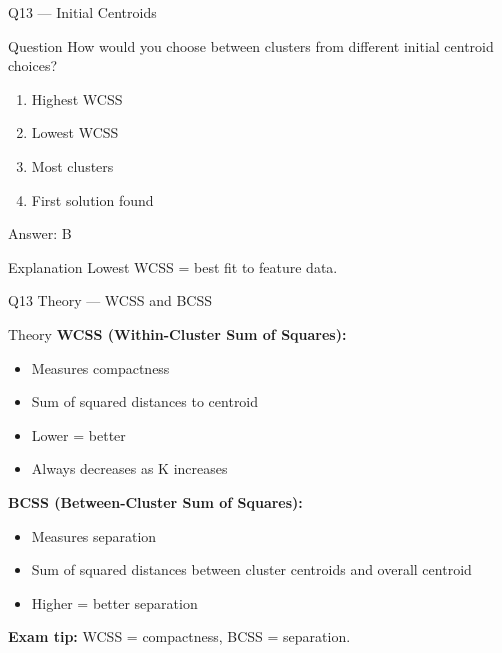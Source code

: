 \documentclass[aspectratio=169,8pt]{beamer}
\begin{document}
	
	\begin{frame}{Q13 --- Initial Centroids}
		\begin{block}{Question}
			How would you choose between clusters from different initial centroid choices?
		\end{block}
		\begin{enumerate}[label=\Alph*.]
			\item Highest WCSS
			\item Lowest WCSS
			\item Most clusters
			\item First solution found
		\end{enumerate}
		\begin{exampleblock}{Answer: B}
		\end{exampleblock}
		\begin{block}{Explanation}
			Lowest WCSS = best fit to feature data.
		\end{block}
	\end{frame}
	
	\begin{frame}{Q13 Theory --- WCSS and BCSS}
		\begin{block}{Theory}
			\textbf{WCSS (Within-Cluster Sum of Squares):}
			\begin{itemize}
				\item Measures compactness
				\item Sum of squared distances to centroid
				\item Lower = better
				\item Always decreases as K increases
			\end{itemize}
			\textbf{BCSS (Between-Cluster Sum of Squares):}
			\begin{itemize}
				\item Measures separation
				\item Sum of squared distances between cluster centroids and overall centroid
				\item Higher = better separation
			\end{itemize}
			\textbf{Exam tip:} WCSS = compactness, BCSS = separation.
		\end{block}
	\end{frame}
	
\end{document}
